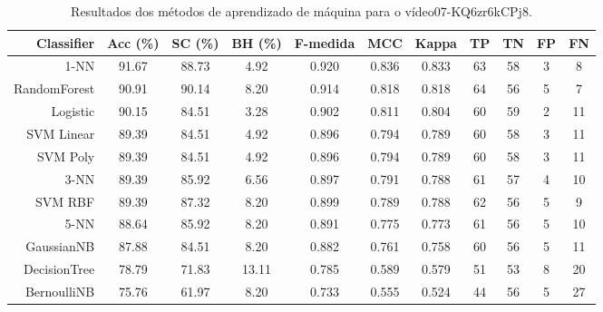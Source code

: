 \begin{table}[!htb]
\centering
\caption{Resultados dos métodos de aprendizado de máquina para o vídeo07-KQ6zr6kCPj8.}
\label{tab:07-KQ6zr6kCPj8}
\begin{tabular}{r|c|c|c|c|c|c|c|c|c|c}
\hline\hline
Classifier & Acc (\%) & SC (\%) & BH (\%) & F-medida & MCC & Kappa & TP & TN & FP & FN \\ \hline
1-NN & 91.67 & 88.73 & 4.92 & 0.920 & 0.836 & 0.833 & 63 & 58 & 3 & 8 \\ 
RandomForest & 90.91 & 90.14 & 8.20 & 0.914 & 0.818 & 0.818 & 64 & 56 & 5 & 7 \\ 
Logistic & 90.15 & 84.51 & 3.28 & 0.902 & 0.811 & 0.804 & 60 & 59 & 2 & 11 \\ 
SVM Linear & 89.39 & 84.51 & 4.92 & 0.896 & 0.794 & 0.789 & 60 & 58 & 3 & 11 \\ 
SVM Poly & 89.39 & 84.51 & 4.92 & 0.896 & 0.794 & 0.789 & 60 & 58 & 3 & 11 \\ 
3-NN & 89.39 & 85.92 & 6.56 & 0.897 & 0.791 & 0.788 & 61 & 57 & 4 & 10 \\ 
SVM RBF & 89.39 & 87.32 & 8.20 & 0.899 & 0.789 & 0.788 & 62 & 56 & 5 & 9 \\ 
5-NN & 88.64 & 85.92 & 8.20 & 0.891 & 0.775 & 0.773 & 61 & 56 & 5 & 10 \\ 
GaussianNB & 87.88 & 84.51 & 8.20 & 0.882 & 0.761 & 0.758 & 60 & 56 & 5 & 11 \\ 
DecisionTree & 78.79 & 71.83 & 13.11 & 0.785 & 0.589 & 0.579 & 51 & 53 & 8 & 20 \\ 
BernoulliNB & 75.76 & 61.97 & 8.20 & 0.733 & 0.555 & 0.524 & 44 & 56 & 5 & 27 \\ 
\hline\hline
\end{tabular}
\end{table}
